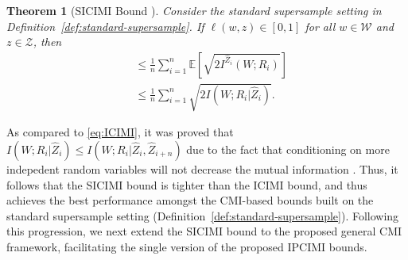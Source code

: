 \documentclass[onecolumn,romanappendices,10pt]{IEEEtran}
\newtheorem{theorem}{Theorem}
\newcommand{\Wcal}{{\mathcal W}}
\newcommand{\Zcal}{{\mathcal Z}}
\newcommand{\EE}{{\mathbb{E}}}
\DeclareMathOperator{\gen}{\overline{gen}}
\begin{document}
	\begin{theorem}[SICIMI Bound \cite{dongexactly}] \label{thm:SICIMI}
		Consider the standard supersample setting in Definition~\ref{def:standard-supersample}. If $\ell(w, z) \in [0, 1]$ for all $w \in \Wcal$ and $z \in \Zcal$, then
		\begin{align}
			\gen &\leq \frac{1}{n} \sum_{i = 1}^n \EE \left[ \sqrt{2 I^{\hat{Z}_i}\left( W; R_i \right)} \right] \label{eq:dis-SICIMI} \\
			&\leq \frac{1}{n} \sum_{i = 1}^n \sqrt{2 I\left( W; R_i | \hat{Z}_i \right)}.
			\label{eq:SICIMI}
		\end{align}
	\end{theorem}
	As compared to \eqref{eq:ICIMI}, it was proved that $I( W; R_i | \hat{Z}_i ) \leq I( W; R_i | \hat{Z}_i, \hat{Z}_{i+n} )$ due to the fact that conditioning on more indepedent random variables will not decrease the mutual information \cite{dongexactly}. Thus, it follows that the SICIMI bound is tighter than the ICIMI bound, and thus achieves the best performance amongst the CMI-based bounds built on the standard supersample setting (Definition~\ref{def:standard-supersample}). Following this progression, we next extend the SICIMI bound to the proposed general CMI framework, facilitating the single version of the proposed IPCIMI bounds. 
	
	
\end{document}
